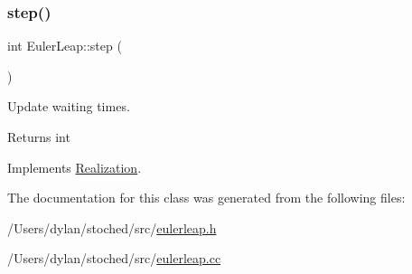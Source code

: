 \subsubsection{\texorpdfstring{step()}{step()}}
{\footnotesize\ttfamily int Euler\+Leap\+::step (\begin{DoxyParamCaption}{ }\end{DoxyParamCaption})\hspace{0.3cm}{\ttfamily [virtual]}}



Update waiting times. 

\begin{DoxyReturn}{Returns}
int 
\end{DoxyReturn}


Implements \hyperlink{class_realization_a9949217117927b149850288f3b74c9ef}{Realization}.



The documentation for this class was generated from the following files\+:\begin{DoxyCompactItemize}
\item 
/\+Users/dylan/stoched/src/\hyperlink{eulerleap_8h}{eulerleap.\+h}\item 
/\+Users/dylan/stoched/src/\hyperlink{eulerleap_8cc}{eulerleap.\+cc}\end{DoxyCompactItemize}
